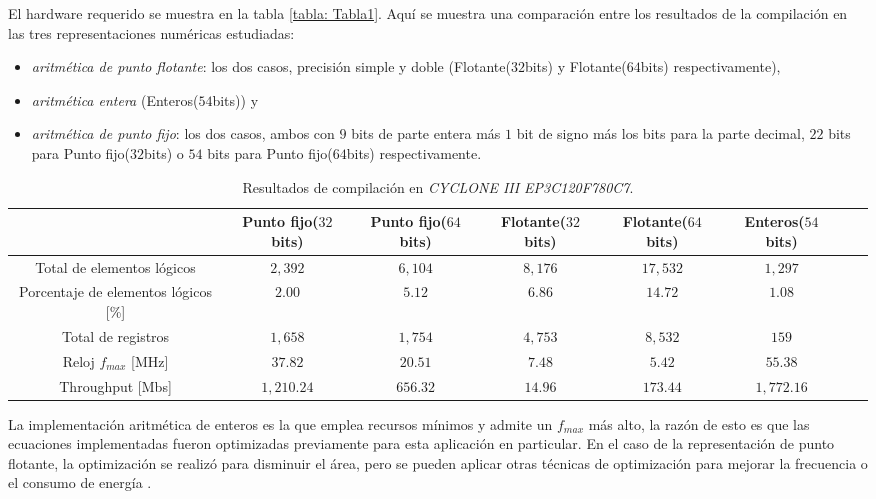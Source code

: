 El hardware requerido se muestra en la tabla \ref{tabla: Tabla1}. Aquí se muestra una comparación entre los resultados de la compilación en las tres representaciones numéricas estudiadas:
\begin{itemize}
\item \textit{aritmética de punto flotante}: los dos casos, precisión simple y doble (Flotante($32$bits) y Flotante($64$bits) respectivamente),
\item \textit{aritmética entera} (Enteros($54$bits)) y
\item \textit{aritmética de punto fijo}: los dos casos, ambos con $9$ bits de parte entera más $1$ bit de signo más los bits para la parte decimal, $22$ bits para Punto fijo($32$bits) o $54$ bits para Punto fijo($64$bits) respectivamente.
\end{itemize}
%
\begin{table*} [tb]
\begin{center}
\caption{Resultados de compilación en \textit{CYCLONE III EP3C120F780C7}.}
\begin{tabular}{|c|c|c|c|c|c|c|c|}
	\hline\hline
	                                     & Punto fijo($32$bits) & Punto fijo($64$bits) & Flotante($32$bits) & Flotante($64$bits) & Enteros($54$bits) &  \\ \hline\hline
	     Total de elementos lógicos      &       $2,392$        &       $6,104$        &      $8,176$       &      $17,532$      &      $1,297$      &  \\ \hline
	Porcentaje de elementos lógicos [\%] &        $2.00$        &        $5.12$        &       $6.86$       &      $14.72$       &      $1.08$       &  \\ \hline
	         Total de registros          &       $1,658$        &       $1,754$        &      $4,753$       &      $8,532 $      &       $159$       &  \\ \hline\hline
	       Reloj $f_{max}$ [MHz]         &       $37.82$        &       $20.51$        &       $7.48$       &       $5.42$       &      $55.38$      &  \\ \hline
	          Throughput [Mbs]           &      $1,210.24$      &       $656.32$       &      $14.96$       &      $173.44$      &    $1,772.16$     &  \\ \hline\hline
\end{tabular}\end{center}
\label{tabla:Tabla1}
\end{table*}

La implementación aritmética de enteros es la que emplea recursos mínimos y admite un $f_{max}$ más alto, la razón de esto es que las ecuaciones implementadas fueron optimizadas previamente para esta aplicación en particular.
En el caso de la representación de punto flotante, la optimización se realizó para disminuir el área, pero se pueden aplicar otras técnicas de optimización para mejorar la frecuencia o el consumo de energía \cite{Giri2012, Gokul2004}.


